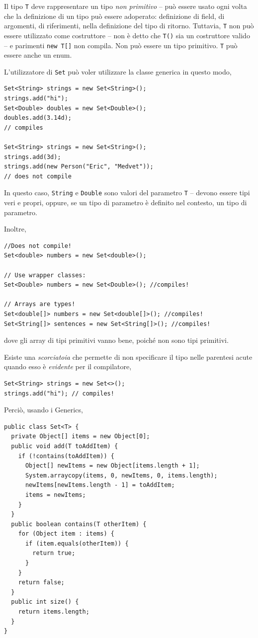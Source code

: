 \documentclass[\fontsizeclass,twocolumn]{\classname}
\theoremstyle{definition}
\theoremstyle{definition}
\begin{document}
Il tipo \texttt{T} deve rappresentare un tipo \emph{non primitivo} -- può
essere usato ogni volta che la definizione di un tipo può essere adoperato:
definizione di field, di argomenti, di riferimenti, nella definizione del tipo
di ritorno. Tuttavia, \texttt{T} non può essere utilizzato come costruttore --
non è detto che \texttt{T()} sia un costruttore valido -- e parimenti
\texttt{new T[]} non compila. Non può essere un tipo primitivo. \texttt{T} può
essere anche un enum.

L'utilizzatore di \texttt{Set} può voler utilizzare la classe generica in
questo modo,

\begin{lstlisting}
Set<String> strings = new Set<String>();
strings.add("hi");
Set<Double> doubles = new Set<Double>();
doubles.add(3.14d);
// compiles

Set<String> strings = new Set<String>();
strings.add(3d);
strings.add(new Person("Eric", "Medvet"));
// does not compile
\end{lstlisting}

In questo caso, \texttt{String} e \texttt{Double} sono valori del parametro
\texttt{T} -- devono essere tipi veri e propri, oppure, se un tipo di parametro
è definito nel contesto, un tipo di parametro.

Inoltre,

\begin{lstlisting}
//Does not compile!
Set<double> numbers = new Set<double>();

// Use wrapper classes:
Set<Double> numbers = new Set<Double>(); //compiles!

// Arrays are types!
Set<double[]> numbers = new Set<double[]>(); //compiles!
Set<String[]> sentences = new Set<String[]>(); //compiles!
\end{lstlisting}

dove gli array di tipi primitivi vanno bene, poiché non sono tipi primitivi.

Esiste una \emph{scorciatoia} che permette di non specificare il tipo nelle
parentesi acute quando esso è \emph{evidente} per il compilatore,

\begin{lstlisting}
Set<String> strings = new Set<>();
strings.add("hi"); // compiles!
\end{lstlisting}

Perciò, usando i Generics,

\begin{lstlisting}
public class Set<T> {
  private Object[] items = new Object[0];
  public void add(T toAddItem) {
    if (!contains(toAddItem)) {
      Object[] newItems = new Object[items.length + 1];
      System.arraycopy(items, 0, newItems, 0, items.length);
      newItems[newItems.length - 1] = toAddItem;
      items = newItems;
    }
  }
  public boolean contains(T otherItem) {
    for (Object item : items) {
      if (item.equals(otherItem)) {
        return true;
      }
    }
    return false;
  }
  public int size() {
    return items.length;
  }
}
\end{lstlisting}
\end{document}
